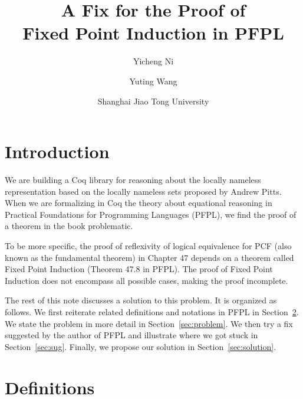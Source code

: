 \documentclass{article}
\begin{document}
 
 

\newcommand{\fix}[2]{\mathrm{fix}^{#1}\;x:\tau\;\mathrm{is}\;\mathit{#2}}
\newcommand{\afix}[3]{#1\{\fix{#2}{#3}\}}
 
\title{A Fix for the Proof of \\
  Fixed Point Induction in PFPL}
\author{Yicheng Ni \and Yuting Wang}
\date{Shanghai Jiao Tong University}
 
\maketitle

\section{Introduction}

We are building a Coq library for reasoning about the locally nameless
representation based on the locally nameless sets proposed by Andrew Pitts.
When we are formalizing in Coq the theory about equational reasoning in
Practical Foundations for Programming Languages (PFPL),
we find the proof of a theorem in the book problematic.

To be more specific, the proof of
reflexivity of logical equivalence for PCF (also known as the fundamental theorem) in Chapter 47 depends on a theorem called Fixed Point Induction (Theorem 47.8 in PFPL).
The proof of Fixed Point Induction
does not encompass all possible cases, making the proof incomplete.

The rest of this note discusses a solution to this problem. It is
organized as follows.  We first reiterate related definitions and
notations in PFPL in Section~\ref{sec:def}.  We state the problem in more
detail in Section~\ref{sec:problem}.  We then try a fix suggested by
the author of PFPL and illustrate where we got stuck in Section~\ref{sec:sug}.
Finally, we propose our solution in Section~\ref{sec:solution}.

\section{Definitions}
\label{sec:def}
\end{document}
